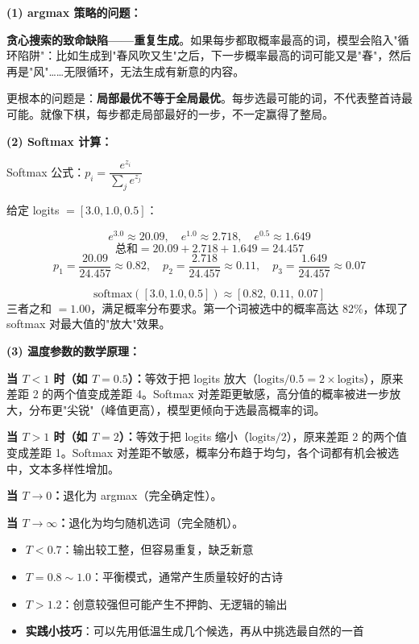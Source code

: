 \documentclass[a4paper,11pt]{ctexart}
\begin{document}
\begin{solutionbox}[参考答案与详细解析]
    \textbf{(1) argmax 策略的问题：}

    \textbf{贪心搜索的致命缺陷——重复生成}。如果每步都取概率最高的词，模型会陷入"循环陷阱"：比如生成到"春风吹又生"之后，下一步概率最高的词可能又是"春"，然后再是"风"……无限循环，无法生成有新意的内容。

    更根本的问题是：\textbf{局部最优不等于全局最优}。每步选最可能的词，不代表整首诗最可能。就像下棋，每步都走局部最好的一步，不一定赢得了整局。

    \vspace{0.5em}
    \textbf{(2) Softmax 计算：}

    Softmax 公式：$p_i = \dfrac{e^{z_i}}{\sum_{j} e^{z_j}}$

    给定 logits $= [3.0, 1.0, 0.5]$：

    \[
    e^{3.0} \approx 20.09, \quad e^{1.0} \approx 2.718, \quad e^{0.5} \approx 1.649
    \]
    \[
    \text{总和} = 20.09 + 2.718 + 1.649 = 24.457
    \]
    \[
    p_1 = \frac{20.09}{24.457} \approx 0.82, \quad
    p_2 = \frac{2.718}{24.457} \approx 0.11, \quad
    p_3 = \frac{1.649}{24.457} \approx 0.07
    \]

    \[
    \boxed{\text{softmax}([3.0, 1.0, 0.5]) \approx [0.82,\ 0.11,\ 0.07]}
    \]
    三者之和 $= 1.00$，满足概率分布要求。第一个词被选中的概率高达 82\%，体现了 softmax 对最大值的"放大"效果。

    \vspace{0.5em}
    \textbf{(3) 温度参数的数学原理：}

    \textbf{当 $T < 1$ 时（如 $T=0.5$）：}等效于把 logits 放大（$\text{logits}/0.5 = 2\times\text{logits}$），原来差距 2 的两个值变成差距 4。Softmax 对差距更敏感，高分值的概率被进一步放大，分布更"尖锐"（峰值更高），模型更倾向于选最高概率的词。

    \textbf{当 $T > 1$ 时（如 $T=2$）：}等效于把 logits 缩小（$\text{logits}/2$），原来差距 2 的两个值变成差距 1。Softmax 对差距不敏感，概率分布趋于均匀，各个词都有机会被选中，文本多样性增加。

    \textbf{当 $T \to 0$：}退化为 argmax（完全确定性）。

    \textbf{当 $T \to \infty$：}退化为均匀随机选词（完全随机）。

    \begin{keybox}[古诗生成中温度的实用建议]
        \begin{itemize}
            \item \textbf{$T < 0.7$}：输出较工整，但容易重复，缺乏新意
            \item \textbf{$T = 0.8 \sim 1.0$}：平衡模式，通常产生质量较好的古诗
            \item \textbf{$T > 1.2$}：创意较强但可能产生不押韵、无逻辑的输出
            \item \textbf{实践小技巧}：可以先用低温生成几个候选，再从中挑选最自然的一首
        \end{itemize}
    \end{keybox}


\end{solutionbox}
\end{document}
